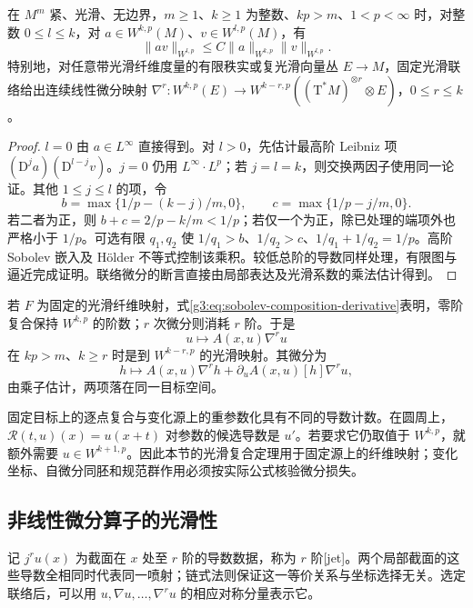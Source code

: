 \begin{proposition}\label{g3:prop:sobolev-multiplier-loss}
	在 \(M^m\) 紧、光滑、无边界，\(m\ge1\)、\(k\ge1\) 为整数、\(kp>m\)、\(1<p<\infty\) 时，对整数 \(0\le l\le k\)，对 \(a\in W^{k,p}(M)\)、\(v\in W^{l,p}(M)\)，有
	\begin{equation}\label{g3:eq:sobolev-multiplier-loss}
		\|av\|_{W^{l,p}}\le C\|a\|_{W^{k,p}}\|v\|_{W^{l,p}}.
	\end{equation}
	特别地，对任意带光滑纤维度量的有限秩实或复光滑向量丛 \(E\to M\)，固定光滑联络给出连续线性微分映射
	\(\nabla^r:W^{k,p}(E)\to W^{k-r,p}((\mathrm T^*M)^{\otimes r}\otimes E)\)，\(0\le r\le k\)。
\end{proposition}
\begin{proof}
	\(l=0\) 由 \(a\in L^\infty\) 直接得到。对 \(l>0\)，先估计最高阶 Leibniz 项 \((\mathrm D^j a)(\mathrm D^{l-j}v)\)。\(j=0\) 仍用 \(L^\infty\cdot L^p\)；若 \(j=l=k\)，则交换两因子使用同一论证。其他 \(1\le j\le l\) 的项，令
	\[
		b=\max\{1/p-(k-j)/m,0\},\qquad
		c=\max\{1/p-j/m,0\}.
	\]
	若二者为正，则 \(b+c=2/p-k/m<1/p\)；若仅一个为正，除已处理的端项外也严格小于 \(1/p\)。可选有限 \(q_1,q_2\) 使 \(1/q_1>b\)、\(1/q_2>c\)、\(1/q_1+1/q_2=1/p\)。高阶 Sobolev 嵌入及 Hölder 不等式控制该乘积。较低总阶的导数同样处理，有限图与逼近完成证明。联络微分的断言直接由局部表达及光滑系数的乘法估计得到。
\end{proof}

若 \(F\) 为固定的光滑纤维映射，式\eqref{g3:eq:sobolev-composition-derivative}表明，零阶复合保持 \(W^{k,p}\) 的阶数；\(r\) 次微分则消耗 \(r\) 阶。于是
\[
	u\longmapsto A(x,u)\nabla^r u
\]
在 \(kp>m\)、\(k\ge r\) 时是到 \(W^{k-r,p}\) 的光滑映射。其微分为
\[
	h\longmapsto A(x,u)\nabla^r h
	+\partial_uA(x,u)[h]\nabla^r u,
\]
由乘子估计，两项落在同一目标空间。

\ProseParagraphBreak

固定目标上的逐点复合与变化源上的重参数化具有不同的导数计数。在圆周上，\(\mathcal R(t,u)(x)=u(x+t)\) 对参数的候选导数是 \(u'\)。若要求它仍取值于 \(W^{k,p}\)，就额外需要 \(u\in W^{k+1,p}\)。因此本节的光滑复合定理用于固定源上的纤维映射；变化坐标、自微分同胚和规范群作用必须按实际公式核验微分损失。

\subsection{非线性微分算子的光滑性}
\label{g3:subsec:1306:04}
记 \(j^ru(x)\) 为截面在 \(x\) 处至 \(r\) 阶的导数数据，称为 \(r\) 阶[jet]。两个局部截面的这些导数全相同时代表同一喷射；链式法则保证这一等价关系与坐标选择无关。选定联络后，可以用 \(u,\nabla u,\ldots,\nabla^ru\) 的相应对称分量表示它。

